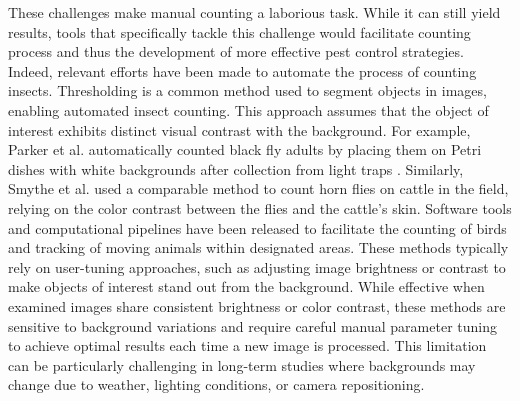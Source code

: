 These challenges make manual counting a laborious task. While it can still yield results, tools that specifically tackle this challenge would facilitate counting process and thus the development of more effective pest control strategies. Indeed, relevant efforts have been made to automate the process of counting insects. Thresholding is a common method used to segment objects in images, enabling automated insect counting. This approach assumes that the object of interest exhibits distinct visual contrast with the background. For example, Parker et al. automatically counted black fly adults by placing them on Petri dishes with white backgrounds after collection from light traps \cite{parker_using_2020}. Similarly, Smythe et al. \cite{smythe_using_2020} used a comparable method to count horn flies on cattle in the field, relying on the color contrast between the flies and the cattle's skin. Software tools and computational pipelines have been released to facilitate the counting of birds \cite{marchowski_drones_2021} and tracking of moving animals \cite{chiara_animalta_2023} within designated areas. These methods typically rely on user-tuning approaches, such as adjusting image brightness or contrast to make objects of interest stand out from the background. While effective when examined images share consistent brightness or color contrast, these methods are sensitive to background variations and require careful manual parameter tuning to achieve optimal results each time a new image is processed. This limitation can be particularly challenging in long-term studies where backgrounds may change due to weather, lighting conditions, or camera repositioning.

